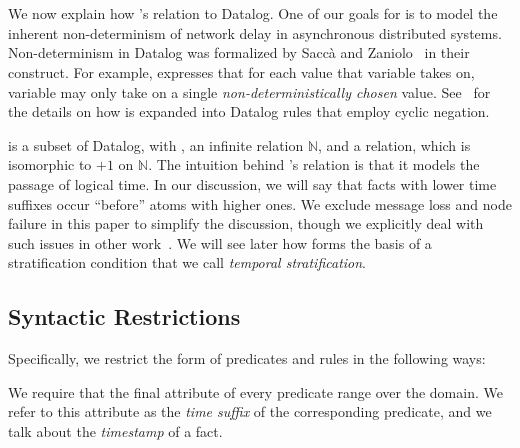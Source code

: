 \section{\lang}

We now explain how \lang's relation to Datalog.  One of our goals for \lang is to model the inherent non-determinism of network
delay in asynchronous distributed systems.  Non-determinism in Datalog was
formalized by Sacc\`{a} and Zaniolo~\cite{sacca-zaniolo} in their
 construct.  For example,
 expresses that for each value
that variable  takes on, variable  may only take on a
single {\em non-deterministically chosen} value. 
See~\cite{sacca-zaniolo} for the details on how  is expanded
into Datalog rules that employ cyclic negation.

\lang is a subset of Datalog, with , an infinite
 relation $\mathbb{N}$, and a 
relation, which is isomorphic to $+1$ on $\mathbb{N}$.  The intuition behind
\lang's  relation is that it models the passage of logical
time.  In our discussion, we will say that facts with lower time suffixes occur
``before'' atoms with higher ones.  
We exclude message loss and node failure in this paper to
simplify the discussion, though we explicitly deal with such issues in other
work~\cite{dedalus-techr, netdb}.
We will see later how  forms the basis of a stratification
condition that we call {\em temporal stratification}.

\subsection{Syntactic Restrictions}
\label{sec:syntaxrestrictions}

Specifically, we restrict the form of predicates and rules in the following ways:

We require that the final attribute of every \lang
predicate range over the  domain.  
We refer to this attribute as the \emph{time suffix} of the corresponding
predicate, and we talk about the {\em timestamp} of a fact. 

